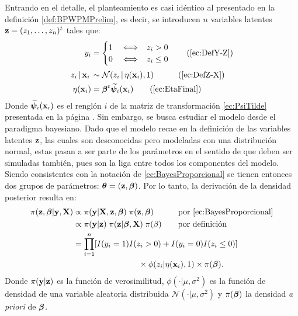 \documentclass[../Main/Main.tex]{subfiles}
\begin{document}
Entrando en el detalle, el planteamiento es casi idéntico al presentado en la definición \ref{def:BPWPMPrelim}, es decir, se introducen $n$ variables latentes $\mathbf{z} = (z_1,\ldots,z_n)^t$ tales que:
\begin{align}
y_i &= 
	\begin{cases}
		1 & \iff \enspace z_i > 0 \\									0 & \iff \enspace z_i \leq 0
	\end{cases} \tag{\ref{ec:DefY-Z}} \\[2pt]
z_i\,|\,\xni\, &\sim \mathcal{N}(z_i\,|\,\eta(\xni),1)\quad \tag{\ref{ec:DefZ-X}}  \\
	\eta(\xni) &= \bm{\beta}^t\xnpsi \tag{\ref{ec:EtaFinal}}
\end{align}
Donde $\widetilde{\bm{\psi}}_i(\mathbf{x}_i)$ es el renglón $i$ de la matriz de transformación \eqref{ec:PsiTilde} presentada en la página \pageref{ec:PsiTilde}.
Sin embargo, se busca estudiar el modelo desde el paradigma bayesiano. Dado que el modelo recae en la definición de las variables latentes $\mathbf{z}$, las cuales son desconocidas pero modeladas con una distribución normal, estas pasan a ser parte de los parámetros en el sentido de que deben ser simuladas también, pues son la liga entre todos los componentes del modelo. Siendo consistentes con la notación de \eqref{ec:BayesProporcional} se tienen entonces dos grupos de parámetros:  $\bm{\theta} = (\mathbf{z}, \bm{\beta})$. Por lo tanto, la derivación de la densidad posterior resulta en:
\begin{align}
	\pi(\mathbf{z}, \bm{\beta}| \mathbf{y}, \mathbf{X})
		& \propto \pi(\mathbf{y} | \mathbf{X}, \mathbf{z}, \bm{\beta}) 
		\; \pi(\mathbf{z}, \bm{\beta}) \quad\qquad\text{por \eqref{ec:BayesProporcional}}\nonumber \\
	& \propto \pi(\mathbf{y} | \mathbf{z})\; \pi(\mathbf{z}|\bm{\beta},\mathbf{X}) 
		\; \pi(\beta) \qquad\text{por definición} \nonumber \\
	& = \prod_{i = 1}^n[I(y_i = 1)I(z_i > 0) +
		 I(y_i = 0)I(z_i \leq 0)] \nonumber \\
		 &\qquad\qquad\qquad\qquad\times \phi(z_i|\eta(\mathbf{x}_i),1) 				\times \pi(\bm{\beta}). \label{ec:BayesChibbPosterior}
\end{align}
Donde $\pi(\mathbf{y} | \mathbf{z})$ es la función de verosimilitud, $\phi(\cdot|\mu,\sigma^2)$ es la función de densidad de una variable aleatoria distribuida $\mathcal{N}(\cdot|\mu,\sigma^2)$ y $\pi(\bm{\beta})$ la densidad \textit{a priori} de $\bm{\beta}$.
\end{document}
